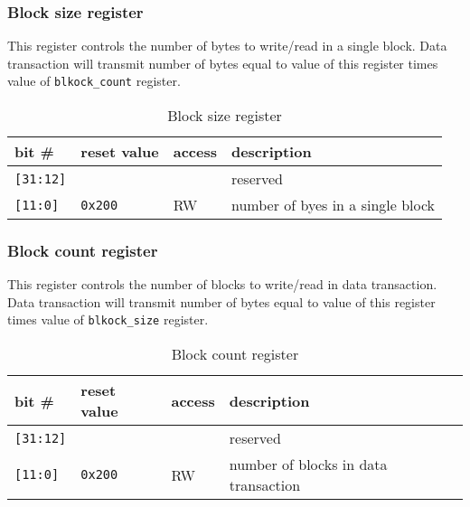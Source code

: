     \subsubsection{Block size register}
    \label{sec:blocksize_reg}
    
    This register controls the number of bytes to write/read in a single block. Data transaction will transmit number of bytes equal to value of this register times value
    of \texttt{blkock\_count} register.
    
    \begin{table}[H]
    \caption{Block size register}
        \begin{tabular}{m{1.3cm}|m{2cm}|m{1cm}|m{8cm}}
                \rowcolor[gray]{0.7} bit \# & reset value & access & description \\ \hline \hline
                \texttt{[31:12]} & & & reserved \\ \hline
                \texttt{[11:0]} & \texttt{0x200} & RW & number of byes in a single block \\ \hline
                \hline
        \end{tabular}
        \label{tab:blocksize_reg}
    \end{table}
    
    \subsubsection{Block count register}
    \label{sec:blockcnt_reg}
    
    This register controls the number of blocks to write/read in data transaction. Data transaction will transmit number of bytes equal to value of this register times value
    of \texttt{blkock\_size} register.
    
    \begin{table}[H]
    \caption{Block count register}
        \begin{tabular}{m{1.3cm}|m{2cm}|m{1cm}|m{8cm}}
                \rowcolor[gray]{0.7} bit \# & reset value & access & description \\ \hline \hline
                \texttt{[31:12]} & & & reserved \\ \hline
                \texttt{[11:0]} & \texttt{0x200} & RW & number of blocks in data transaction \\ \hline
                \hline
        \end{tabular}
        \label{tab:blockcnt_reg}
    \end{table}
    
